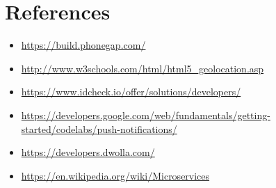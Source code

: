 \documentclass[english]{article}
\begin{document}
\section{References}
	\begin{itemize}
\item{\url{https://build.phonegap.com/}}
\item{\url{http://www.w3schools.com/html/html5_geolocation.asp}}
\item{\url{https://www.idcheck.io/offer/solutions/developers/}}
\item{\url{https://developers.google.com/web/fundamentals/getting-started/codelabs/push-notifications/}}
\item{\url{https://developers.dwolla.com/}}
\item{\url{https://en.wikipedia.org/wiki/Microservices}}
	\end{itemize}
\end{document}
